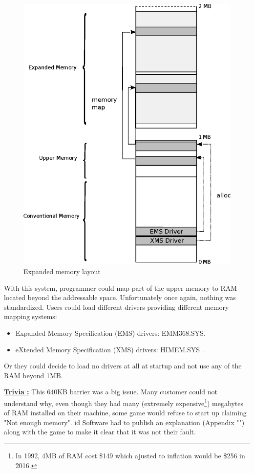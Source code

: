 \documentclass[book.tex]{subfiles}
\begin{document}
\begin{figure}[H]
\centering
\includegraphics[width=\textwidth]{imgs/expanded_ram}
\caption{Expanded memory layout}
\label{fig:ems_xms_layout}
\end{figure}
With this system, programmer could map part of the upper memory to RAM located beyond the addressable space.
Unfortunately once again, nothing was standardized. Users could load different drivers providing different memory mapping systems:
\begin{itemize}
\item Expanded Memory Specification (EMS) drivers: EMM368.SYS.
\item eXtended Memory Specification (XMS) drivers: HIMEM.SYS .
\end{itemize}

Or they could decide to load no drivers at all at startup and not use any of the RAM beyond 1MB.\\
\par
\textbf{\underline{Trivia :}}  This 640KB barrier was a big issue. Many customer could not understand why, even though they had many (extremely expensive\footnote{In 1992, 4MB of RAM cost \$149 which ajusted to inflation would be \$256 in 2016.}) megabytes of RAM installed on their machine, some game would refuse to start up claiming "Not enough memory". id Software had to publish an explanation (Appendix "") along with the game to make it clear that it was not their fault.\\
\end{document}
